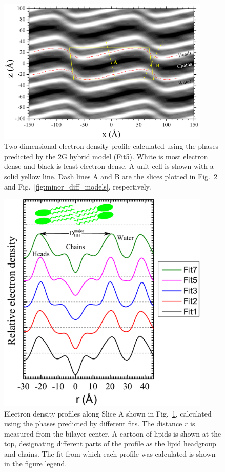 \begin{figure}[htbp]
  \centering
  \includegraphics[width=0.9\textwidth]{figures/ripple/LAXS/Fit5_2D_edp}
  \caption[Two dimensional electron density profile calculated using the phases
  predicted by the 2G hybrid model (Fit5)]
  {Two dimensional electron density profile calculated using the phases
  predicted by the 2G hybrid model (Fit5). White is most electron dense
  and black is least electron dense. A unit cell is shown with a solid yellow 
  line. Dash lines A and B are the slices plotted in 
  Fig.~\ref{fig:major_diff_models} and Fig.~\ref{fig:minor_diff_models},
  respectively.}
  \label{fig:Fit5_2D_edp}
\end{figure}

\begin{figure}[htbp]
  \centering
  \includegraphics[width=0.9\textwidth]{figures/ripple/LAXS/major_diff_models}
  \caption{Electron density profiles along Slice A shown in Fig.~\ref{fig:Fit5_2D_edp}, 
  calculated using the phases
  predicted by different fits. The distance $r$ is measured from the bilayer 
  center. A cartoon of lipids is shown at the top, designating different parts of the profile
  as the lipid headgroup and chains. The fit from which each profile was calculated
  is shown in the figure legend.}
  \label{fig:major_diff_models}
\end{figure}

